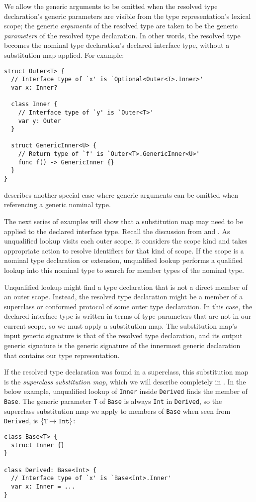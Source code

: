 \documentclass[../generics]{subfiles}
\begin{document}
We allow the generic arguments to be omitted when the resolved type declaration's generic parameters are visible from the type representation's lexical scope; the generic \emph{arguments} of the resolved type are taken to be the generic \emph{parameters} of the resolved type declaration. In other words, the resolved type becomes the nominal type declaration's declared interface type, without a substitution map applied. For example:
\begin{Verbatim}
struct Outer<T> {
  // Interface type of `x' is `Optional<Outer<T>.Inner>'
  var x: Inner?

  class Inner {
    // Interface type of `y' is `Outer<T>'
    var y: Outer
  }

  struct GenericInner<U> {
    // Return type of `f' is `Outer<T>.GenericInner<U>'
    func f() -> GenericInner {}
  }
}
\end{Verbatim}
 describes another special case where generic arguments can be omitted when referencing a generic nominal type.

The next series of examples will show that a substitution map may need to be applied to the declared interface type. Recall the discussion from  and . As unqualified lookup visits each outer scope, it considers the scope kind and takes appropriate action to resolve identifiers for that kind of scope. If the scope is a nominal type declaration or extension, unqualified lookup performs a qualified lookup into this nominal type to search for member types of the nominal type.

Unqualified lookup might find a type declaration that is not a direct member of an outer scope. Instead, the resolved type declaration might be a member of a superclass or conformed protocol of some outer type declaration. In this case, the declared interface type is written in terms of type parameters that are not in our current scope, so we must apply a substitution map. The substitution map's input generic signature is that of the resolved type declaration, and its output generic signature is the generic signature of the innermost generic declaration that contains our type representation.

If the resolved type declaration was found in a superclass, this substitution map is the \emph{superclass substitution map}, which we will describe completely in . In the below example, unqualified lookup of \texttt{Inner} inside \texttt{Derived} finds the member of \texttt{Base}. The generic parameter \texttt{T} of \texttt{Base} is always \texttt{Int} in \texttt{Derived}, so the superclass substitution map we apply to members of \texttt{Base} when seen from \texttt{Derived}, is $\{\texttt{T} \mapsto \texttt{Int}\}$:
\begin{Verbatim}
class Base<T> {
  struct Inner {}
}

class Derived: Base<Int> {
  // Interface type of `x' is `Base<Int>.Inner'
  var x: Inner = ...
}
\end{Verbatim}
\end{document}
